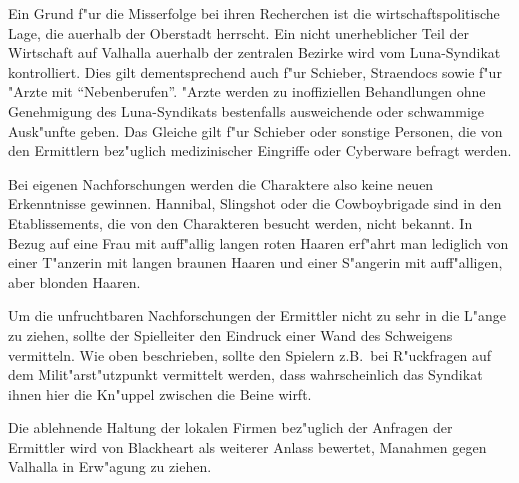 Ein Grund f"ur die Misserfolge bei ihren Recherchen ist die wirtschaftspolitische Lage, die au\3erhalb der Oberstadt herrscht. Ein nicht unerheblicher Teil der Wirtschaft auf Valhalla au\3erhalb der zentralen Bezirke wird vom Luna-Syndikat kontrolliert. Dies gilt dementsprechend auch f"ur Schieber, Stra\3endocs sowie f"ur "Arzte mit ``Nebenberufen''. "Arzte werden zu inoffiziellen Behandlungen ohne Genehmigung des Luna-Syndikats bestenfalls ausweichende oder schwammige Ausk"unfte geben. Das Gleiche gilt f"ur Schieber oder sonstige Personen, die von den Ermittlern bez"uglich medizinischer Eingriffe oder Cyberware befragt werden.

Bei eigenen Nachforschungen werden die Charaktere also keine neuen Erkenntnisse gewinnen. Hannibal, Slingshot oder die Cowboybrigade sind in den Etablissements, die von den Charakteren besucht werden, nicht bekannt. In Bezug auf eine Frau mit auff"allig langen roten Haaren erf"ahrt man lediglich von einer T"anzerin mit langen braunen Haaren und einer S"angerin mit auff"alligen, aber blonden Haaren.

\begin{remarks}
	Um die unfruchtbaren Nachforschungen der Ermittler nicht zu sehr in die L"ange zu ziehen, sollte der Spielleiter den Eindruck einer Wand des Schweigens vermitteln. Wie oben beschrieben, sollte den Spielern z.B.~bei R"uckfragen auf dem Milit"arst"utzpunkt vermittelt werden, dass wahrscheinlich das Syndikat ihnen hier die Kn"uppel zwischen die Beine wirft.

	Die ablehnende Haltung der lokalen Firmen bez"uglich der Anfragen der Ermittler wird von Blackheart als weiterer Anlass bewertet, Ma\3nahmen gegen Valhalla in Erw"agung zu ziehen.
\end{remarks}
